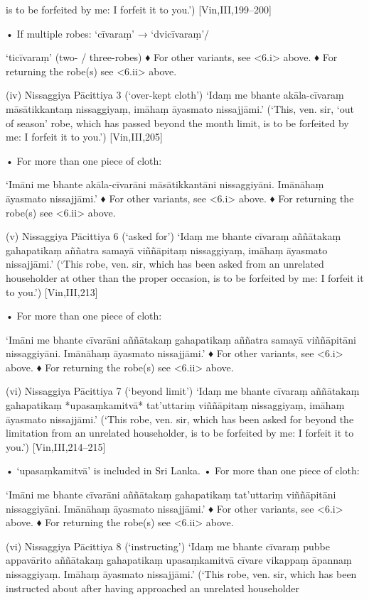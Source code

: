 is to be forfeited by me: I forfeit it to you.’)
[Vin,III,199–200]

• If multiple robes: ‘cīvaraṃ’ → ‘dvicīvaraṃ’/

‘ticīvaraṃ’ (two- / three-robes)
♦ For other variants, see <6.i> above.
♦ For returning the robe(s) see <6.ii> above.

(iv) Nissaggiya Pācittiya 3 (‘over-kept cloth’)
‘Idaṃ me bhante akāla-cīvaraṃ
māsātikkantaṃ nissaggiyaṃ,
imāhaṃ āyasmato nissajjāmi.’
(‘This, ven. sir, ‘out of season’ robe, which has
passed beyond the month limit, is to be forfeited
by me: I forfeit it to you.’)
[Vin,III,205]

• For more than one piece of cloth:

‘Imāni me bhante akāla-cīvarāni
māsātikkantāni nissaggiyāni.
Imānāhaṃ āyasmato nissajjāmi.’
♦ For other variants, see <6.i> above.
♦ For returning the robe(s) see <6.ii> above.

(v) Nissaggiya Pācittiya 6 (‘asked for’)
‘Idaṃ me bhante cīvaraṃ aññātakaṃ
gahapatikaṃ aññatra samayā viññāpitaṃ
nissaggiyaṃ, imāhaṃ āyasmato nissajjāmi.’
(‘This robe, ven. sir, which has been asked from an
unrelated householder at other than the proper
occasion, is to be forfeited by me: I forfeit it to you.’)
[Vin,III,213]

• For more than one piece of cloth:

‘Imāni me bhante cīvarāni aññātakaṃ
gahapatikaṃ aññatra samayā viññāpitāni
nissaggiyāni. Imānāhaṃ āyasmato nissajjāmi.’
♦ For other variants, see <6.i> above.
♦ For returning the robe(s) see <6.ii> above.

(vi) Nissaggiya Pācittiya 7 (‘beyond limit’)
‘Idaṃ me bhante cīvaraṃ aññātakaṃ
gahapatikaṃ *upasaṃkamitvā* tat'uttariṃ
viññāpitaṃ nissaggiyaṃ,
imāhaṃ āyasmato nissajjāmi.’
(‘This robe, ven. sir, which has been asked for beyond
the limitation from an unrelated householder, is to be
forfeited by me: I forfeit it to you.’)
[Vin,III,214–215]

• ‘upasaṃkamitvā’ is included in Sri Lanka.
• For more than one piece of cloth:

‘Imāni me bhante cīvarāni aññātakaṃ
gahapatikaṃ tat'uttariṃ viññāpitāni
nissaggiyāni. Imānāhaṃ āyasmato nissajjāmi.’
♦ For other variants, see <6.i> above.
♦ For returning the robe(s) see <6.ii> above.

(vi) Nissaggiya Pācittiya 8 (‘instructing’)
‘Idaṃ me bhante cīvaraṃ pubbe appavārito
aññātakaṃ gahapatikaṃ upasaṃkamitvā
cīvare vikappaṃ āpannaṃ nissaggiyaṃ.
Imāhaṃ āyasmato nissajjāmi.’
(‘This robe, ven. sir, which has been instructed about
after having approached an unrelated householder

